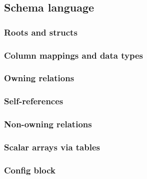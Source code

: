 
\subsection{Schema language}

\subsubsection{Roots and structs}

\subsubsection{Column mappings and data types}

\subsubsection{Owning relations}

\subsubsection{Self-references}

\subsubsection{Non-owning relations}

\subsubsection{Scalar arrays via tables}

\subsubsection{Config block}


